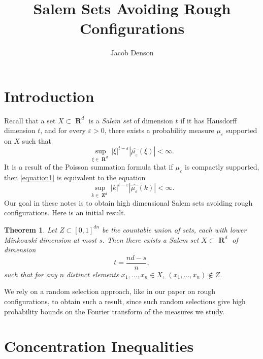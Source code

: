 \documentclass[12pt,reqno]{article}
\title{Salem Sets Avoiding Rough Configurations}
\author{Jacob Denson}
\numberwithin{equation}{section}
\DeclareMathOperator{\RR}{\mathbf{R}}
\DeclareMathOperator{\ZZ}{\mathbf{Z}}
\newtheorem{theorem}{Theorem}
\begin{document}
\maketitle

\section{Introduction}

Recall that a set $X \subset \RR^d$ is a \emph{Salem set} of dimension $t$ if it has Hausdorff dimension $t$, and for every $\varepsilon > 0$, there exists a probability measure $\mu_\varepsilon$ supported on $X$ such that
%
\begin{equation} \label{equation1}
    \sup_{\xi \in \RR^d} |\xi|^{t - \varepsilon} |\widehat{\mu_\varepsilon}(\xi)| < \infty.
\end{equation}
%
It is a result of the Poisson summation formula that if $\mu_\varepsilon$ is compactly supported, then \eqref{equation1} is equivalent to the equation
%
\begin{equation}
    \sup_{k \in \ZZ^d} |k|^{t - \varepsilon} |\widehat{\mu_\varepsilon}(k)| < \infty.
\end{equation}
%
Our goal in these notes is to obtain high dimensional Salem sets avoiding rough configurations. Here is an initial result.

\begin{theorem} \label{maintheorem}
    Let $Z \subset [0,1]^{dn}$ be the countable union of sets, each with lower Minkowski dimension at most $s$. Then there exists a Salem set $X \subset \RR^d$ of dimension
    \[ t = \frac{nd - s}{n}, \]
    such that for any $n$ distinct elements $x_1, \dots, x_n \in X$, $(x_1, \dots, x_n) \not \in Z$.
\end{theorem}

We rely on a random selection approach, like in our paper on rough configurations, to obtain such a result, since such random selections give high probability bounds on the Fourier transform of the measures we study.

\section{Concentration Inequalities}
\end{document}
